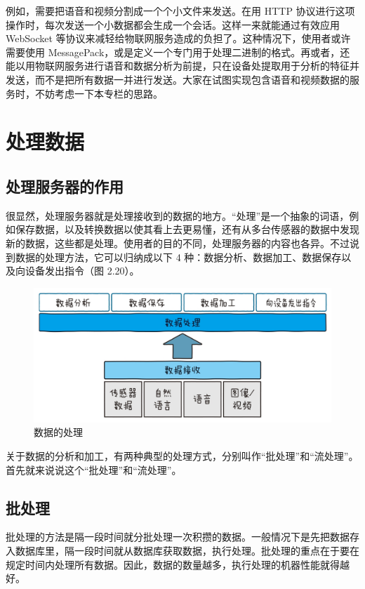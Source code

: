 \documentclass[12pt,UTF8]{ctexbook}
\begin{document}
例如，需要把语音和视频分割成一个个小文件来发送。在用 HTTP 协议进行这项操作时，每次发送一个小数据都会生成一个会话。这样一来就能通过有效应用 WebSocket 等协议来减轻给物联网服务造成的负担了。这种情况下，使用者或许需要使用 MessagePack，或是定义一个专门用于处理二进制的格式。再或者，还能以用物联网服务进行语音和数据分析为前提，只在设备处提取用于分析的特征并发送，而不是把所有数据一并进行发送。大家在试图实现包含语音和视频数据的服务时，不妨考虑一下本专栏的思路。

\section{处理数据}

\subsection{处理服务器的作用}

很显然，处理服务器就是处理接收到的数据的地方。“处理”是一个抽象的词语，例如保存数据，以及转换数据以使其看上去更易懂，还有从多台传感器的数据中发现新的数据，这些都是处理。使用者的目的不同，处理服务器的内容也各异。不过说到数据的处理方法，它可以归纳成以下 4 种：数据分析、数据加工、数据保存以及向设备发出指令（图 2.20）。

\begin{figure}[htbp]
	\centering
	\includegraphics[width=1\linewidth]{39}
	\caption{数据的处理}
	\label{fig:1}
\end{figure}

关于数据的分析和加工，有两种典型的处理方式，分别叫作“批处理”和“流处理”。首先就来说说这个“批处理”和“流处理”。

\subsection{批处理}

批处理的方法是隔一段时间就分批处理一次积攒的数据。一般情况下是先把数据存入数据库里，隔一段时间就从数据库获取数据，执行处理。批处理的重点在于要在规定时间内处理所有数据。因此，数据的数量越多，执行处理的机器性能就得越好。
\end{document}
